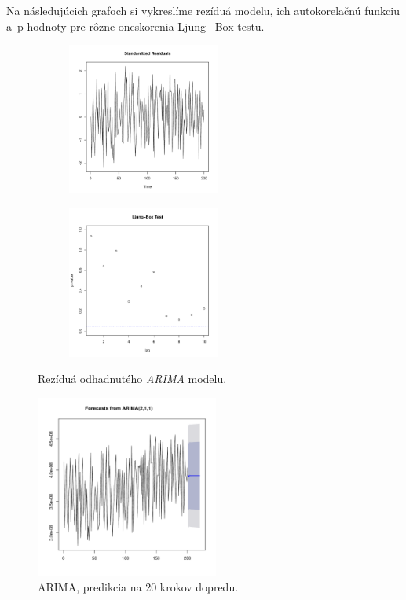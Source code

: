 \documentclass[12pt,a4paper,oneside,final]{article}
\theoremstyle{definition}
\theoremstyle{remark}
\numberwithin{equation}{section}
\begin{document}
Na následujúcich grafoch si vykreslíme rezíduá modelu, ich autokorelačnú funkciu
a~\mbox{p-hodnoty}
pre rôzne oneskorenia Ljung\,--\,Box testu.

\begin{figure}[H] \centering
    \begin{subfigure}{0.55\textwidth}
        \centering
        \includegraphics[width=1\linewidth,height=5cm]{images/heap_resid.pdf}
        \label{obr:heap_resid_resid}
    \end{subfigure}
    \begin{subfigure}{0.55\textwidth}
        \centering
        \includegraphics[width=1\linewidth,height=5cm]{images/heap_box.pdf}
    \end{subfigure}
    \caption{Rezíduá odhadnutého \emph{ARIMA} modelu.}
     \label{obr:heap_resid}
\end{figure}

\begin{figure}[H]
    \begin{center}
        \includegraphics[width=.8\textwidth,height=6cm]{images/heap_forecast.pdf}
        \caption{ARIMA, predikcia na 20 krokov dopredu.}
        \label{obr:heap_forecast}
    \end{center}
\end{figure}
\end{document}

